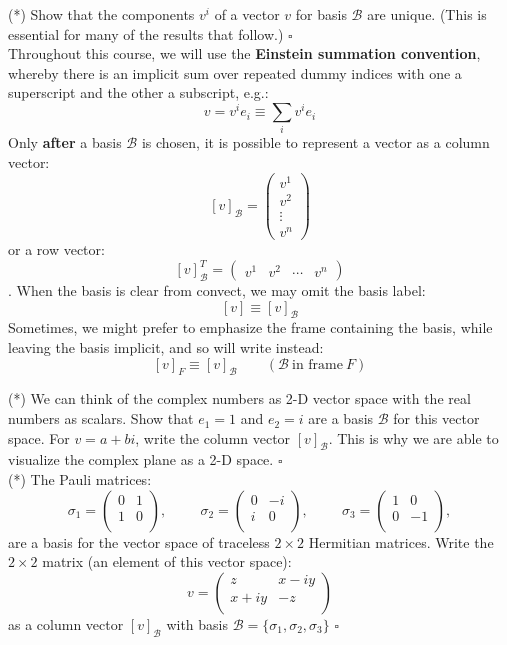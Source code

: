 \documentclass[12pt]{article}
\begin{document}
\exercise (*) Show that the components $v^i$ of a vector $v$ for basis
$\mathcal{B}$ are unique. (This is essential for many of the results
that follow.)  $\square$ \\[3pt]

\noindent
Throughout this course, we will use the {\bf Einstein summation
  convention}, whereby there is an implicit sum over repeated dummy
indices with one a superscript and the other a subscript, e.g.:
$$v = v^i e_i \equiv \sum_i v^i e_i$$
Only {\bf after} a basis $\mathcal{B}$ is chosen, it is possible to represent a vector as a column vector:
$$[v]_{\mathcal{B}} = \begin{pmatrix} v^1 \\ v^2 \\ \vdots \\ v^n \end{pmatrix}$$
or a row vector:
$$[v]_{\mathcal{B}}^T = \begin{pmatrix} v^1 & v^2 & \cdots & v^n \end{pmatrix}$$.
When the basis is clear from convect, we may omit the basis label:
$$[v] \equiv [v]_\mathcal{B}$$
Sometimes, we might prefer to emphasize the frame containing
the basis, while leaving the basis implicit, and so will write instead:
$$[v]_F \equiv [v]_\mathcal{B} \quad \quad (\mathcal{B}~\text{in frame}~F)$$

\exercise (*) We can think of the complex numbers as 2-D vector space with
the real numbers as scalars.  Show that $e_1 = 1$ and $e_2 = i$ are a
basis $\mathcal{B}$ for this vector space.  For $v = a + b i$, write
the column vector $[v]_\mathcal{B}$.  This is why we are able to
visualize the complex plane as a 2-D space.  $\square$ \\[3pt]

\exercise (*) The Pauli matrices:
$$\sigma_1 = \begin{pmatrix}
  0 &  1 \\ 1  & 0 \\
\end{pmatrix},\hspace{1cm}
\sigma_2 = \begin{pmatrix}
  0 &  -i \\ i  & 0 \\
\end{pmatrix},\hspace{1cm}
\sigma_3 = \begin{pmatrix}
  1 &  0 \\ 0  & -1 \\
\end{pmatrix},
$$
are a basis for the vector space of traceless $2\times2$ Hermitian matrices.  Write the $2\times2$ matrix (an element of this vector space):
$$v =
\begin{pmatrix}
  z &  x-iy \\ x+iy  & -z \\
\end{pmatrix}$$
as a column vector $[v]_\mathcal{B}$ with basis $\mathcal{B}=\{\sigma_1, \sigma_2, \sigma_3 \}$  $\square$ \\[3pt]
\end{document}
